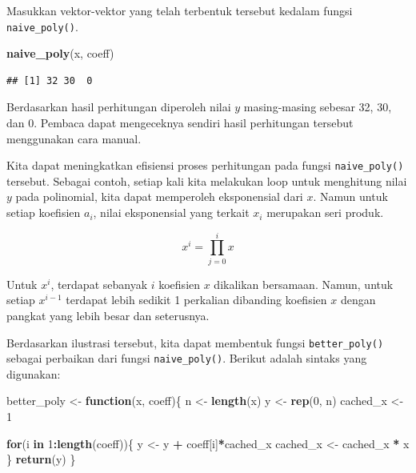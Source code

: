 \documentclass[]{book}
\newenvironment{Shaded}{\begin{snugshade}}{\end{snugshade}}
\newcommand{\ControlFlowTok}[1]{\textcolor[rgb]{0.13,0.29,0.53}{\textbf{#1}}}
\newcommand{\DecValTok}[1]{\textcolor[rgb]{0.00,0.00,0.81}{#1}}
\newcommand{\KeywordTok}[1]{\textcolor[rgb]{0.13,0.29,0.53}{\textbf{#1}}}
\newcommand{\NormalTok}[1]{#1}
\newcommand{\OperatorTok}[1]{\textcolor[rgb]{0.81,0.36,0.00}{\textbf{#1}}}
\newcommand{\StringTok}[1]{\textcolor[rgb]{0.31,0.60,0.02}{#1}}
\theoremstyle{definition}
\theoremstyle{definition}
\theoremstyle{definition}
\theoremstyle{remark}
\begin{document}
Masukkan vektor-vektor yang telah terbentuk tersebut kedalam fungsi \texttt{naive\_poly()}.

\begin{Shaded}
\begin{Highlighting}[]
\KeywordTok{naive_poly}\NormalTok{(x, coeff)}
\end{Highlighting}
\end{Shaded}

\begin{verbatim}
## [1] 32 30  0
\end{verbatim}

Berdasarkan hasil perhitungan diperoleh nilai \(y\) masing-masing sebesar 32, 30, dan 0. Pembaca dapat mengeceknya sendiri hasil perhitungan tersebut menggunakan cara manual.

Kita dapat meningkatkan efisiensi proses perhitungan pada fungsi \texttt{naive\_poly()} tersebut. Sebagai contoh, setiap kali kita melakukan loop untuk menghitung nilai \(y\) pada polinomial, kita dapat memperoleh eksponensial dari \(x\). Namun untuk setiap koefisien \(a_i\), nilai eksponensial yang terkait \(x_i\) merupakan seri produk.

\begin{equation}
x^i=\prod_{j=0}^ix
  \label{eq:evalpoly2}
\end{equation}

Untuk \(x^i\), terdapat sebanyak \(i\) koefisien \(x\) dikalikan bersamaan. Namun, untuk setiap \(x^{i-1}\) terdapat lebih sedikit 1 perkalian dibanding koefisien \(x\) dengan pangkat yang lebih besar dan seterusnya.

Berdasarkan ilustrasi tersebut, kita dapat membentuk fungsi \texttt{better\_poly()} sebagai perbaikan dari fungsi \texttt{naive\_poly()}. Berikut adalah sintaks yang digunakan:

\begin{Shaded}
\begin{Highlighting}[]
\NormalTok{better_poly <-}\StringTok{ }\ControlFlowTok{function}\NormalTok{(x, coeff)\{}
\NormalTok{  n <-}\StringTok{ }\KeywordTok{length}\NormalTok{(x)}
\NormalTok{  y <-}\StringTok{ }\KeywordTok{rep}\NormalTok{(}\DecValTok{0}\NormalTok{, n)}
\NormalTok{  cached_x <-}\StringTok{ }\DecValTok{1}
  
  \ControlFlowTok{for}\NormalTok{(i }\ControlFlowTok{in} \DecValTok{1}\OperatorTok{:}\KeywordTok{length}\NormalTok{(coeff))\{}
\NormalTok{    y <-}\StringTok{ }\NormalTok{y }\OperatorTok{+}\StringTok{ }\NormalTok{coeff[i]}\OperatorTok{*}\NormalTok{cached_x}
\NormalTok{    cached_x <-}\StringTok{ }\NormalTok{cached_x }\OperatorTok{*}\StringTok{ }\NormalTok{x}
\NormalTok{  \}}
  \KeywordTok{return}\NormalTok{(y)}
\NormalTok{\}}
\end{Highlighting}
\end{Shaded}
\end{document}
